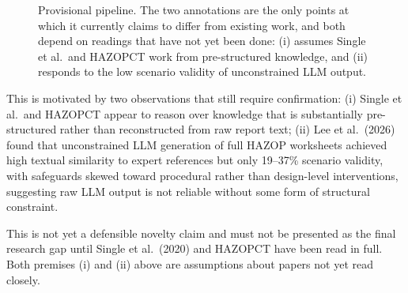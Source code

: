 \begin{figure}[htbp]
\centering
{}
\caption[Provisional research direction]{Provisional pipeline. The two
annotations are the only points at which it currently claims to differ from
existing work, and both depend on readings that have not yet been done:
(i) assumes Single et al.\ and HAZOPCT work from pre-structured knowledge,
and (ii) responds to the low scenario validity of unconstrained LLM output.}
\label{fig:direction}
\end{figure}

This is motivated by two observations that still require confirmation: (i) Single et al.\ and HAZOPCT appear to reason over knowledge that is substantially pre-structured rather than reconstructed from raw report text; (ii) Lee et al.\ (2026) \cite{lee2026llmhazop} found that unconstrained LLM generation of full HAZOP worksheets achieved high textual similarity to expert references but only 19--37\% scenario validity, with safeguards skewed toward procedural rather than design-level interventions, suggesting raw LLM output is not reliable without some form of structural constraint.

\begin{provisional}
This is not yet a defensible novelty claim and must not be presented as the
final research gap until Single et al.\ (2020) and HAZOPCT have been read in
full. Both premises (i) and (ii) above are assumptions about papers not yet
read closely.
\end{provisional}

